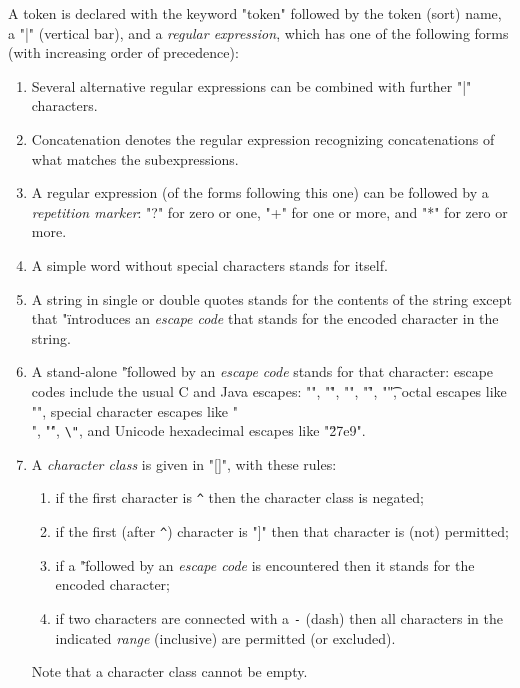 \documentclass[11pt]{article} %
\begin{document}
\begin{manual}\label{man:token}
  A token is declared with the keyword "token" followed by the token (sort) name, a "|" (vertical
  bar), and a \emph{regular expression}, which has one of the following forms (with increasing order
  of precedence):
  \begin{enumerate}

  \item Several alternative regular expressions can be combined with further "|" characters.

  \item Concatenation denotes the regular expression recognizing concatenations of what matches the
    subexpressions.

  \item A regular expression (of the forms following this one) can be followed by a \emph{repetition
      marker}: "?" for zero or one, "+" for one or more, and "*" for zero or more.

  \item A simple word without special characters stands for itself.

  \item A string in single or double quotes stands for the contents of the string except that "\"
    introduces an \emph{escape code} that stands for the encoded character in the string.

  \item A stand-alone "\" followed by an \emph{escape code} stands for that character: escape codes
    include the usual C and Java escapes: "\n", "\r", "\a", "\f", "\t", octal escapes like "",
    special character escapes like "\\", "\'", \verb|\"|, and Unicode hexadecimal escapes like
    "\u27e9".

  \item A \emph{character class} is given in "[]", with these rules:
   \begin{enumerate}
    \item if the first character is \verb"^" then the character class is negated;
    \item if the first (after \verb"^") character is "]" then that character is (not) permitted;
    \item if a "\" followed by an \emph{escape code} is encountered then it stands for the encoded
      character;
    \item if two characters are connected with a \verb"-" (dash) then all characters in the
      indicated \emph{range} (inclusive) are permitted (or excluded).
    \end{enumerate}
    Note that a character class cannot be empty.


\end{enumerate}
\end{manual}
\end{document}
